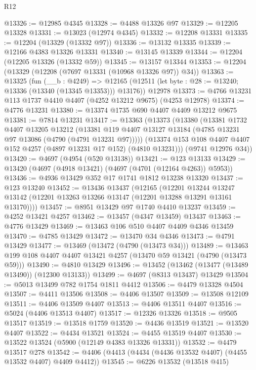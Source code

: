 \begin{lexlean}{R12}
\begin{coremodule}
@13326 := @12985 @4345
@13328 := @4488 @13326 @97
@13329 := @12205 @13328
@13331 := @13023 (@12974 @4345)
@13332 := @12208 @13331
@13335 := @12204 (@13329 (@13332 @97))
@13336 := @13132 @13335
@13339 := @12166 @4383 @13326 @13331
@13340 := @13145 @13339
@13344 := @12204 (@12205 @13326 (@13332 @59))
@13345 := @13157 @13344
@13353 := @12204 (@13329 (@12208 (@7697 @13331 (@10968 @13326 @97)) @34))
@13363 := @13325
    (fun (__b : @4249) =>
    @12165 (@12511 (let byte : @28 := @13240; @13336 (@13340 (@13345 @13353))) @13176))
    @12978
@13373 := @4766 @13231 @113 @1737 @4410 @4407 (@4252 @13212 @9675) (@4253 @12978)
@13374 := @4776 @13231
@13380 := @13374 @1735 @690 @4407 @4409 @13212 @9675
@13381 := @7814 @13231
@13417 := @13363
    (@13373
      (@13380
        (@13381
          @1732
          @4407
          @13205
          @13212
          (@13381 @119 @4407 @13127 @13184 (@4785 @13231 @97 @13086 (@4790 (@4791 @13231 @97)))))
        (@13374 @153 @108 @4407 @4407 @152 @4257 (@4897 @13231 @17 @152) (@4810 @13231)))
      (@9741 @12976 @34))
@13420 := @4697 (@4954 (@520 @13138))
@13421 := @123 @13133
@13429 := @13420 (@4697 (@4918 @13421) (@4697 (@4701 (@12164 @4263)) @5953))
@13436 := @4936 @13429 @352 @17 @1741 @1812 @13238 @13320
@13437 := @123 @13240
@13452 := @13436
    @13437
    (@12165
      (@12201
        @13244
        @13247
        @13142
        (@12201 @13263 @13266 @13147 (@12201 @13288 @13291 @13161 @13170))))
@13457 := @8951 @13429 @97 @1740 @4410 @13237
@13459 := @4252 @13421 @4257
@13462 := @13457 (@4347 @13459) @13437
@13463 := @4776 @13429
@13469 := @13463 @106 @510 @4407 @4409 @4346 @13459
@13470 := @4785 @13429
@13472 := @13470 @34 @4346
@13473 := @4791 @13429
@13477 := @13469 (@13472 (@4790 (@13473 @34)))
@13489 := @13463 @199 @108 @4407 @4407 @13421 @4257 (@13470 @59 @13421 (@4790 (@13473 @59)))
@13490 := @4810 @13429
@13496 := @13452 (@13462 (@13477 (@13489 @13490)) (@12300 @13133))
@13499 := @4697 (@8313 @13437) @13429
@13504 := @5013 @13499 @782 @1754 @1811 @4412
@13506 := @4479 @13328 @4504
@13507 := @4411 @13506
@13508 := @4406 @13507
@13509 := @13508 @12109
@13511 := @4406 @13509 @4407
@13513 := @4406 @13511 @4407
@13516 := @5024 (@4406 @13513 @4407)
@13517 := @12326 @13326
@13518 := @9505 @13517
@13519 := @13518 @1759
@13520 := @4436 @13519
@13521 := @13520 @4407
@13522 := @4434 @13521
@13524 := @4455 @13519 @4407
@13530 := @13522 @13524 (@5900 (@12149 @4383 @13326 @13331))
@13532 := @4479 @13517 @278
@13542 := @4406 (@4413 (@4434 (@4436 @13532 @4407) (@4455 @13532 @4407) @4409 @4412))
@13545 := @6226 @13532 (@13518 @415)

\end{coremodule}
\end{lexlean}
